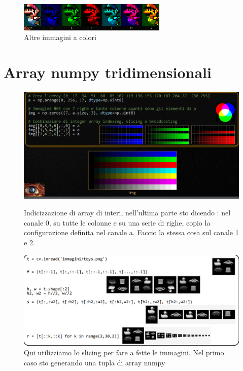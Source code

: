 \begin{figure}[htp]
	\includegraphics[width=200pt]{./immagini/opencv_images_c2.png}
	\caption{Altre immagini a colori}
	\label{img:opencv_images_c2}
\end{figure}

\newpage

\section{Array numpy tridimensionali}

\begin{figure}[htp]
	\includegraphics[width=\linewidth]{./immagini/opencv_images_c3.png}
	\label{img:opencv_images_c3}
	\caption{Indicizzazione di array di interi, nell'ultima parte sto dicendo : nel canale 0, su tutte le colonne e su una serie di righe, copio la configurazione definita nel canale a. Faccio la stessa cosa sul canale 1 e 2.}
\end{figure}

\begin{figure}[htp]
	\includegraphics[width=\linewidth]{./immagini/opencv_images_c4.png}
	\caption{Qui utilizziamo lo slicing per fare a fette le immagini. Nel primo caso sto generando una tupla di array numpy}
	\label{img:opencv_images_c4}
\end{figure}

